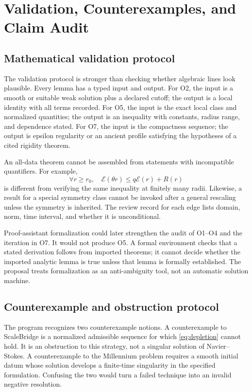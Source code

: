 \documentclass[conference]{../../../../Conference-LaTeX-template_10-17-19/IEEEtran}
\begin{document}
\section{Validation, Counterexamples, and Claim Audit}
\subsection{Mathematical validation protocol}
The validation protocol is stronger than checking whether algebraic lines look plausible. Every lemma has a typed input and output. For O2, the input is a smooth or suitable weak solution plus a declared cutoff; the output is a local identity with all terms recorded. For O5, the input is the exact local class and normalized quantities; the output is an inequality with constants, radius range, and dependence stated. For O7, the input is the compactness sequence; the output is epsilon regularity or an ancient profile satisfying the hypotheses of a cited rigidity theorem.

An all-data theorem cannot be assembled from statements with incompatible quantifiers. For example,
\begin{equation}
\forall r\ge r_0,\quad \mathcal E(\theta r)\le q\mathcal E(r)+R(r)
\label{eq:allradii}
\end{equation}
is different from verifying the same inequality at finitely many radii. Likewise, a result for a special symmetry class cannot be invoked after a general rescaling unless the symmetry is inherited. The review record for each edge lists domain, norm, time interval, and whether it is unconditional.

Proof-assistant formalization could later strengthen the audit of O1--O4 and the iteration in O7. It would not produce O5. A formal environment checks that a stated derivation follows from imported theorems; it cannot decide whether the imported analytic lemma is true unless that lemma is formally established. The proposal treats formalization as an anti-ambiguity tool, not an automatic solution machine.

\subsection{Counterexample and obstruction protocol}
The program recognizes two counterexample notions. A counterexample to ScaleBridge is a normalized admissible sequence for which \eqref{eq:depletion} cannot hold. It is an obstruction to this strategy, not a singular solution of Navier--Stokes. A counterexample to the Millennium problem requires a smooth initial datum whose solution develops a finite-time singularity in the specified formulation. Confusing the two would turn a failed technique into an invalid negative resolution.
\end{document}

